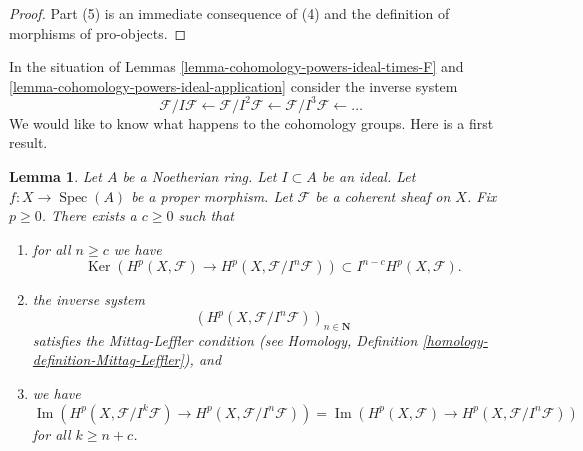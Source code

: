 \documentclass{stacks-project}
\theoremstyle{plain}
\newtheorem{lemma}[subsection]{Lemma}
\theoremstyle{definition}
\theoremstyle{remark}
\numberwithin{equation}{subsection}
\def\Spec{\mathop{\mathrm{Spec}}}
\def\Ker{\mathop{\mathrm{Ker}}}
\def\Im{\mathop{\mathrm{Im}}}
\begin{document}
\begin{proof}
\medskip\noindent
Part (5) is an immediate consequence of (4) and the definition of
morphisms of pro-objects.
\end{proof}

\noindent
In the situation of Lemmas \ref{lemma-cohomology-powers-ideal-times-F} and
\ref{lemma-cohomology-powers-ideal-application} consider the inverse
system
$$
\mathcal{F}/I\mathcal{F} \leftarrow
\mathcal{F}/I^2\mathcal{F} \leftarrow
\mathcal{F}/I^3\mathcal{F} \leftarrow \ldots
$$
We would like to know what happens to the cohomology groups.
Here is a first result.

\begin{lemma}
\label{lemma-ML-cohomology-powers-ideal}
Let $A$ be a Noetherian ring.
Let $I \subset A$ be an ideal.
Let $f : X \to \Spec(A)$ be a proper morphism.
Let $\mathcal{F}$ be a coherent sheaf on $X$.
Fix $p \geq 0$. There exists a $c \geq 0$ such that
\begin{enumerate}
\item for all $n \geq c$ we have
$$
\Ker(H^p(X, \mathcal{F}) \to H^p(X, \mathcal{F}/I^n\mathcal{F})) \subset
I^{n - c}H^p(X, \mathcal{F}).
$$
\item the inverse system
$$
\left(H^p(X, \mathcal{F}/I^n\mathcal{F})\right)_{n \in \mathbf{N}}
$$
satisfies the Mittag-Leffler condition (see
Homology, Definition \ref{homology-definition-Mittag-Leffler}), and
\item we have
$$
\Im(H^p(X, \mathcal{F}/I^k\mathcal{F})
\to H^p(X, \mathcal{F}/I^n\mathcal{F}))
=
\Im(H^p(X, \mathcal{F})
\to H^p(X, \mathcal{F}/I^n\mathcal{F}))
$$
for all $k \geq n + c$.
\end{enumerate}
\end{lemma}
\end{document}

